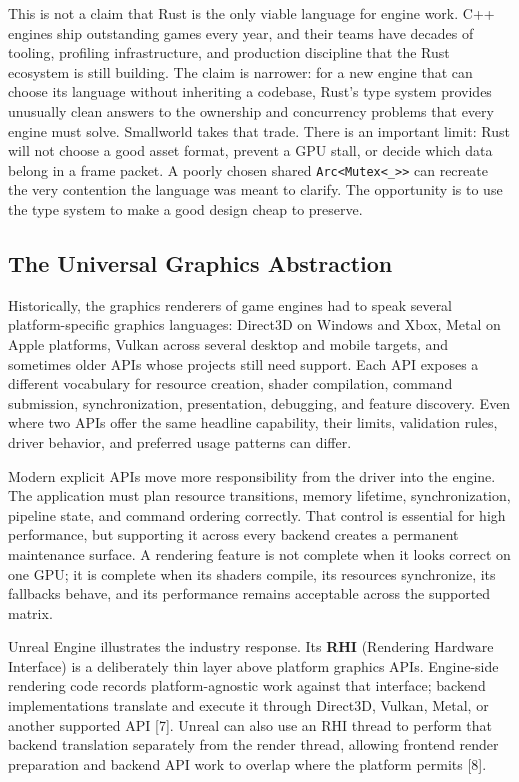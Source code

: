 \documentclass[
  11pt,
  letterpaper,
  DIV=11,
  numbers=noendperiod,
  twoside,
  open=right]{scrreprt}
\begin{document}
This is not a claim that Rust is the only viable language for engine
work. C++ engines ship outstanding games every year, and their teams
have decades of tooling, profiling infrastructure, and production
discipline that the Rust ecosystem is still building. The claim is
narrower: for a new engine that can choose its language without
inheriting a codebase, Rust's type system provides unusually clean
answers to the ownership and concurrency problems that every engine must
solve. Smallworld takes that trade. There is an important limit: Rust
will not choose a good asset format, prevent a GPU stall, or decide
which data belong in a frame packet. A poorly chosen shared
\texttt{Arc\textless{}Mutex\textless{}\_\textgreater{}\textgreater{}}
can recreate the very contention the language was meant to clarify. The
opportunity is to use the type system to make a good design cheap to
preserve.

\subsection{The Universal Graphics
Abstraction}\label{the-universal-graphics-abstraction}

Historically, the graphics renderers of game engines had to speak
several platform-specific graphics languages: Direct3D on Windows and
Xbox, Metal on Apple platforms, Vulkan across several desktop and mobile
targets, and sometimes older APIs whose projects still need support.
Each API exposes a different vocabulary for resource creation, shader
compilation, command submission, synchronization, presentation,
debugging, and feature discovery. Even where two APIs offer the same
headline capability, their limits, validation rules, driver behavior,
and preferred usage patterns can differ.

Modern explicit APIs move more responsibility from the driver into the
engine. The application must plan resource transitions, memory lifetime,
synchronization, pipeline state, and command ordering correctly. That
control is essential for high performance, but supporting it across
every backend creates a permanent maintenance surface. A rendering
feature is not complete when it looks correct on one GPU; it is complete
when its shaders compile, its resources synchronize, its fallbacks
behave, and its performance remains acceptable across the supported
matrix.

Unreal Engine illustrates the industry response. Its \textbf{RHI}
(Rendering Hardware Interface) is a deliberately thin layer above
platform graphics APIs. Engine-side rendering code records
platform-agnostic work against that interface; backend implementations
translate and execute it through Direct3D, Vulkan, Metal, or another
supported API {[}7{]}. Unreal can also use an RHI thread to perform that
backend translation separately from the render thread, allowing frontend
render preparation and backend API work to overlap where the platform
permits {[}8{]}.
\end{document}
